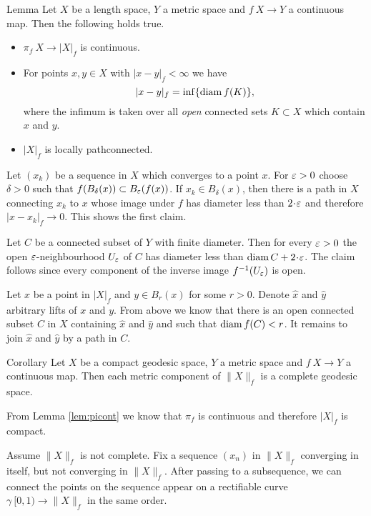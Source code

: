 \documentclass{article}
\begin{document}
\begin{thm}{Lemma}\label{lem:picont}
Let $X$ be a length space, $Y$ a metric space and $f\:X\to Y$ a continuous map. 
Then the following holds true.
\begin{itemize}
\item $\pi_f\:X\to|X|_f$ is continuous.

 \item For points $x,y\in X$ with $|x-y|_f<\infty$ we have
\[|x-y|_f=\inf\{\mathop{\rm diam}\nolimits f(K)\},\]
where the infimum is taken over all {\em open} connected sets $K\subset X$ which contain $x$ and $y$.

\item $|X|_f$ is locally pathconnected.
\end{itemize}

\end{thm}

Let $(x_k)$ be a sequence in $X$ which converges to a point $x$. 
For $\varepsilon>0$ choose $\delta>0$ such that $f(B_\delta(x))\subset B_\varepsilon(f(x))$. 
If $x_k\in B_\delta(x)$, then there is a path in $X$ connecting $x_k$ to $x$ whose image under $f$ has diameter less than $2\cdot\eps$ and therefore $|x-x_k|_f\to 0$. 
This shows the first claim.

Let $C$ be a connected subset of $Y$ with finite diameter. 
Then for every $\varepsilon>0$ the open $\varepsilon$-neighbourhood $U_\varepsilon$ of $C$ has diameter less than $\diam C+2\cdot\eps$. 
The claim follows since every component of the inverse image $f^{-1}(U_\varepsilon)$ is open. 

Let $x$ be a point in $|X|_f$ and $y\in B_r(x)$ for some $r>0$. 
Denote $\hat x$ and $\hat y$ arbitrary lifts of $x$ and $y$.
From above we know that there is an open connected subset $C$ in $X$ containing $\hat x$ and $\hat y$ and such that 
$\mathop{\rm diam}\nolimits f(C)<r$. 
It remains to join $\hat x$ and $\hat y$ by a path in $C$.
\qeds

\begin{thm}{Corollary}\label{cor:geospace}
Let $X$ be a compact geodesic space, $Y$ a metric space and $f\:X\to Y$ a continuous map. 
Then each metric component of $\|X\|_f$ is a complete geodesic space.
\end{thm}

From Lemma \ref{lem:picont} we know that $\pi_f$ is continuous and therefore $|X|_f$ is compact.

Assume $\|X\|_f$ is not complete.
Fix a sequence $(x_n)$ in $\|X\|_f$ converging in itself, but not converging in $\|X\|_f$.
After passing to a subsequence, we can connect the points on the sequence appear on a rectifiable curve $\gamma\:[0,1)\to\|X\|_f$ in the same order.
\end{document}
